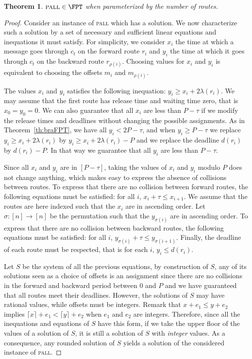 \documentclass[10pt, conference, letterpaper]{IEEEtran}
\newtheorem{theorem}{Theorem}
\newcommand\pall{\textsc{pall}\xspace}
\begin{document}
\begin{theorem}\label{th:pallFPT}
$\pall \in \FPT$ when parameterized by the number of routes.
\end{theorem}
\begin{proof}
 Consider an instance of \pall which has a solution. We now characterize such a solution by a set of necessary and sufficient linear equations and inequations it must satisfy. 
 For simplicity, we consider $x_i$ the time at which a message goes through $c_t$ on the forward route $r_i$ and $y_i$ the time at which it goes through $c_t$ on the backward route $r_{\rho(i)}$.
 Choosing values for $x_i$ and $y_i$ is equivalent to choosing the offsets $m_i$ and $m_{\rho(i)}$.
 
 The values $x_i$ and $y_i$ satisfies the following inequation: $y_i \geq x_i + 2\lambda(r_i)$.
We may assume that the first route has release time and waiting time zero, 
that is $x_0 = y_0 = 0$. We can also guarantee that all $x_i$ are less than $P-\tau$ if we modify
the release times and deadlines without changing the possible assignments. As in Theorem~\ref{th:braFPT}, we have all $y_i < 2P - \tau$,
and  when $y_i \geq P - \tau$ we replace $y_i \geq x_i + 2\lambda(r_i) $ by $y_i \geq x_i + 2\lambda(r_i) - P$ and we replace the deadline $d(r_i)$ by $d(r_i) -P$. In that way we guarantee that all $y_i$ are less than $P-\tau$.  
 
 Since all $x_i$ and $y_i$ are in $[P-\tau]$, taking the values of $x_i$ and $y_i$ modulo $P$
 does not change anything, which makes easy to express the absence of collisions between routes.
 To express that there are no collision between forward routes, the following equations must be  satisfied: for all $i$, $x_i + \tau \leq x_{i+1}$. We assume that the routes are here indexed such that the $x_i$ are in ascending order.
 Let $\sigma : [n] \rightarrow [n]$ be the permutation such that the $y_{\sigma(i)}$ are in ascending order.
 To express that there are no collision between backward routes, the following equations must be  satisfied: for all $i$, $y_{\sigma(i)} + \tau \leq y_{\sigma(i+1)}$. Finally, the deadline of each route must be respected, that is for each $i$, $y_i \leq d(r_i)$. 

 Let $S$ be the system of all the previous equations, by construction of $S$, any of its solutions seen as a choice of offsets is an assignment since there are no collisions in the forward and backward period between $0$ and $P$ and we have guaranteed that all routes meet their deadlines. However, the solutions of $S$ may have rational values, while offsets must be integers. 
Remark that $x +e_1 \leq y + e_2$ implies $\lceil x \rceil +e_1 < \lceil y \rceil + e_2$ when $e_1$ and $e_2$ are integers. Therefore, since all the inequations and equations of $S$ have this form, if we take the upper floor of the values of a solution of $S$, it is still a solution of $S$ with \emph{integer} values. As a consequence, any rounded solution of $S$ yields a solution of the considered instance of \pall.


\end{proof}
\end{document}
